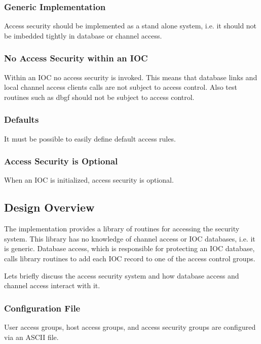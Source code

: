 \subsubsection{Generic Implementation}

Access security should be implemented as a stand alone system, i.e. it should not be imbedded tightly in database or 
channel access.

\subsubsection{No Access Security within an IOC}

Within an IOC no access security is invoked. This means that database links and local channel access clients calls are not 
subject to access control. Also test routines such as dbgf should not be subject to access control.

\subsubsection{Defaults}

It must be possible to easily define default access rules.

\subsubsection{Access Security is Optional}

When an IOC is initialized, access security is optional.

\subsection{Design Overview}

The implementation provides a library of routines for accessing the security system. This library has no knowledge of 
channel access or IOC databases, i.e. it is generic. Database access, which is responsible for protecting an IOC database, 
calls library routines to add each IOC record to one of the access control groups.

Lets briefly discuss the access security system and how database access and channel access interact with it.

\subsubsection{Configuration File}

User access groups, host access groups, and access security groups are configured via an ASCII file.

